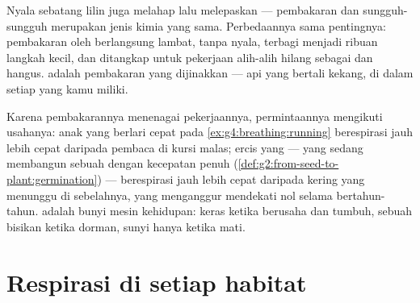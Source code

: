\begin{example}\label{ex:g7:what-is-respiration:fire}
Nyala sebatang lilin juga melahap  lalu melepaskan  --- pembakaran dan  sungguh-sungguh merupakan jenis
kimia yang sama. Perbedaannya sama pentingnya: pembakaran oleh 
berlangsung lambat, tanpa nyala, terbagi menjadi ribuan langkah kecil,
dan  ditangkap untuk pekerjaan alih-alih hilang sebagai
 dan hangus.  adalah pembakaran yang dijinakkan --- api
yang bertali kekang, di dalam setiap  yang kamu miliki.
\end{example}

\begin{example}\label{ex:g7:what-is-respiration:demand}
Karena pembakarannya menenagai pekerjaannya, permintaannya mengikuti
usahanya: anak yang berlari cepat pada
\cref{ex:g4:breathing:running} berespirasi jauh lebih cepat daripada
pembaca di kursi malas; ercis yang  --- yang sedang
membangun sebuah  dengan kecepatan penuh
(\cref{def:g2:from-seed-to-plant:germination}) --- berespirasi jauh
lebih cepat daripada  kering yang menunggu di sebelahnya, yang
 menganggur mendekati nol selama bertahun-tahun. 
adalah bunyi mesin kehidupan: keras ketika berusaha dan tumbuh, sebuah
bisikan ketika dorman, sunyi hanya ketika mati.
\end{example}

\section{Respirasi di setiap habitat}

